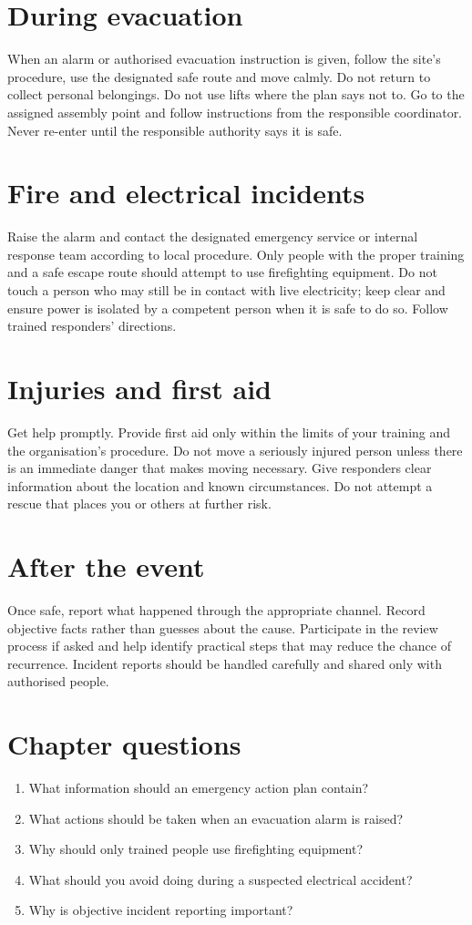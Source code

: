 \documentclass[11pt,openany,oneside]{book}
\begin{document}
\section{During evacuation}
When an alarm or authorised evacuation instruction is given, follow the site's procedure, use the designated safe route and move calmly. Do not return to collect personal belongings. Do not use lifts where the plan says not to. Go to the assigned assembly point and follow instructions from the responsible coordinator. Never re-enter until the responsible authority says it is safe.
\section{Fire and electrical incidents}
Raise the alarm and contact the designated emergency service or internal response team according to local procedure. Only people with the proper training and a safe escape route should attempt to use firefighting equipment. Do not touch a person who may still be in contact with live electricity; keep clear and ensure power is isolated by a competent person when it is safe to do so. Follow trained responders' directions.
\section{Injuries and first aid}
Get help promptly. Provide first aid only within the limits of your training and the organisation's procedure. Do not move a seriously injured person unless there is an immediate danger that makes moving necessary. Give responders clear information about the location and known circumstances. Do not attempt a rescue that places you or others at further risk.
\section{After the event}
Once safe, report what happened through the appropriate channel. Record objective facts rather than guesses about the cause. Participate in the review process if asked and help identify practical steps that may reduce the chance of recurrence. Incident reports should be handled carefully and shared only with authorised people.
\section{Chapter questions}
\begin{enumerate}\item What information should an emergency action plan contain?\item What actions should be taken when an evacuation alarm is raised?\item Why should only trained people use firefighting equipment?\item What should you avoid doing during a suspected electrical accident?\item Why is objective incident reporting important?\end{enumerate}
\end{document}
